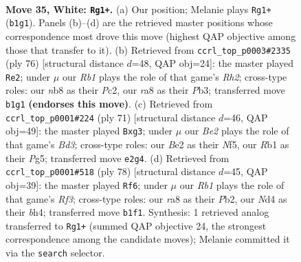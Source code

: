 \documentclass[11pt]{article}
\begin{document}
\clearpage

\begin{figure}[p]\centering
\begin{subfigure}{0.46\textwidth}\centering
\resizebox{\linewidth}{!}{%
\newchessgame
\chessboard[
  setfen={rn6/8/8/5p1p/3N4/pP2K1k1/r3B3/1R6 w - - 0 35},
  showmover=false,
  pgfstyle=straightmove, color=movearrow, markmove={b1-g1}
]}
\caption{}
\end{subfigure}\hfill
\begin{subfigure}{0.46\textwidth}\centering
\resizebox{\linewidth}{!}{%
\newchessgame
\chessboard[
  setfen={6k1/8/4p1r1/1N4P1/3p1r2/PP6/2PK3R/8 w - - 1 39},
  showmover=false,
  pgfstyle=straightmove, color=movearrow, markmove={h2-e2}
]}
\caption{}
\end{subfigure}
\\[4pt]
\begin{subfigure}{0.46\textwidth}\centering
\resizebox{\linewidth}{!}{%
\newchessgame
\chessboard[
  setfen={8/4k3/R2b4/5np1/8/2PR2PK/P4r2/8 b - - 5 36},
  showmover=false,
  pgfstyle=straightmove, color=movearrow, markmove={d6-g3}
]}
\caption{}
\end{subfigure}\hfill
\begin{subfigure}{0.46\textwidth}\centering
\resizebox{\linewidth}{!}{%
\newchessgame
\chessboard[
  setfen={6k1/8/6p1/p1rp2P1/7b/5R2/PPB5/1K6 w - - 0 40},
  showmover=false,
  pgfstyle=straightmove, color=movearrow, markmove={f3-f6}
]}
\caption{}
\end{subfigure}
\caption{\textbf{Move 35, White: \texttt{Rg1+}.} (a) Our position; Melanie plays \texttt{Rg1+} (\texttt{b1g1}). Panels (b)--(d) are the retrieved master positions whose correspondence most drove this move (highest QAP objective among those that transfer to it). (b) Retrieved from \texttt{ccrl\_top\_p0003\#2335} (ply 76) [structural distance $d$=48, QAP obj=24]: the master played \texttt{Re2}; under $\mu$ our \emph{Rb1} plays the role of that game's \emph{Rh2}; cross-type roles: our \emph{n}b8 as their \emph{P}c2, our \emph{r}a8 as their \emph{P}b3; transferred move \texttt{b1g1} \textbf{(endorses this move)}. (c) Retrieved from \texttt{ccrl\_top\_p0001\#224} (ply 71) [structural distance $d$=46, QAP obj=49]: the master played \texttt{Bxg3}; under $\mu$ our \emph{Be2} plays the role of that game's \emph{Bd3}; cross-type roles: our \emph{B}e2 as their \emph{N}f5, our \emph{R}b1 as their \emph{P}g5; transferred move \texttt{e2g4}. (d) Retrieved from \texttt{ccrl\_top\_p0001\#518} (ply 78) [structural distance $d$=45, QAP obj=39]: the master played \texttt{Rf6}; under $\mu$ our \emph{Rb1} plays the role of that game's \emph{Rf3}; cross-type roles: our \emph{r}a8 as their \emph{P}b2, our \emph{N}d4 as their \emph{b}h4; transferred move \texttt{b1f1}. Synthesis: 1 retrieved analog transferred to \texttt{Rg1+} (summed QAP objective 24, the strongest correspondence among the candidate moves); Melanie committed it via the \texttt{search} selector.}
\label{fig:thought-m68}
\end{figure}
\end{document}
